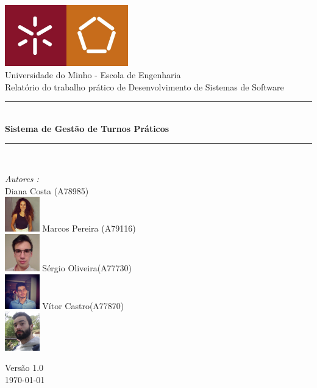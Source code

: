 \documentclass[a4paper]{article}
\begin{document}
\begin{titlepage}
\begin{center}


\includegraphics[width=0.4\textwidth]{logo}\\[0.3cm]

{\large Universidade do Minho - Escola de Engenharia}\\[0.5cm]

{\large Relatório do trabalho prático de Desenvolvimento de Sistemas de Software}\\[0.5cm]



\rule{\linewidth}{0.5mm} \\[0.4cm]
{ \huge \bfseries Sistema de Gestão de Turnos Práticos \\[0.4cm] }
\rule{\linewidth}{0.5mm} \\[1.5cm]

\noindent
\begin{minipage}{0.4\textwidth}
  \begin{flushleft} \large
    \emph{Autores :}\\
    Diana Costa \textsc{(A78985)}\\
    \includegraphics[width=1.5cm]{diana}\break
    Marcos Pereira \textsc{(A79116)}\\
    \includegraphics[width=1.5cm]{marcos}\break
    Sérgio Oliveira\textsc{(A77730)}\\
    \includegraphics[width=1.5cm]{sergio}\break
    Vítor Castro\textsc{(A77870)}\\
    \includegraphics[width=1.5cm]{vitor}\break
  \end{flushleft}
\end{minipage}%
\vfill

{\large Versão 1.0 \\ \today}

\end{center}
\end{titlepage}
\end{document}
